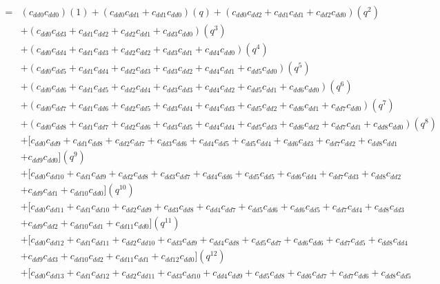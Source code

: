 \documentclass[12pt]{article}
\begin{document}
\begin{align}
    =& (c_{dd0}c_{dd0})(1) + (c_{dd0}c_{dd1} + c_{dd1}c_{dd0})(q) + (c_{dd0}c_{dd2} + c_{dd1}c_{dd1} + c_{dd2}c_{dd0})(q^2) \nonumber\\
    &+ (c_{dd0}c_{dd3} + c_{dd1}c_{dd2} + c_{dd2}c_{dd1} + c_{dd3}c_{dd0})(q^3) \nonumber\\
    &+ (c_{dd0}c_{dd4} + c_{dd1}c_{dd3} + c_{dd2}c_{dd2} + c_{dd3}c_{dd1} + c_{dd4}c_{dd0})(q^4) \nonumber\\
    &+ (c_{dd0}c_{dd5} + c_{dd1}c_{dd4} + c_{dd2}c_{dd3} + c_{dd3}c_{dd2} + c_{dd4}c_{dd1} + c_{dd5}c_{dd0})(q^5) \nonumber\\
    &+ (c_{dd0}c_{dd6} + c_{dd1}c_{dd5} + c_{dd2}c_{dd4} + c_{dd3}c_{dd3} + c_{dd4}c_{dd2} + c_{dd5}c_{dd1} + c_{dd6}c_{dd0})(q^6) \nonumber\\
    &+ (c_{dd0}c_{dd7} + c_{dd1}c_{dd6} + c_{dd2}c_{dd5} + c_{dd3}c_{dd4} + c_{dd4}c_{dd3} + c_{dd5}c_{dd2} + c_{dd6}c_{dd1} + c_{dd7}c_{dd0})(q^7) \nonumber\\
    &+ (c_{dd0}c_{dd8} + c_{dd1}c_{dd7} + c_{dd2}c_{dd6} + c_{dd3}c_{dd5} + c_{dd4}c_{dd4} + c_{dd5}c_{dd3} + c_{dd6}c_{dd2} + c_{dd7}c_{dd1} + c_{dd8}c_{dd0})(q^8) \nonumber\\
    &+ [c_{dd0}c_{dd9} + c_{dd1}c_{dd8} + c_{dd2}c_{dd7} + c_{dd3}c_{dd6} + c_{dd4}c_{dd5} + c_{dd5}c_{dd4} + c_{dd6}c_{dd3} + c_{dd7}c_{dd2} + c_{dd8}c_{dd1} \nonumber\\
    &+ c_{dd9}c_{dd0}](q^9) \nonumber\\
    &+ [c_{dd0}c_{dd10} + c_{dd1}c_{dd9} + c_{dd2}c_{dd8} + c_{dd3}c_{dd7} + c_{dd4}c_{dd6} + c_{dd5}c_{dd5} + c_{dd6}c_{dd4} + c_{dd7}c_{dd3} + c_{dd8}c_{dd2} \nonumber\\
    &+ c_{dd9}c_{dd1} + c_{dd10}c_{dd0}](q^{10}) \nonumber\\
    &+ [c_{dd0}c_{dd11} + c_{dd1}c_{dd10} + c_{dd2}c_{dd9} + c_{dd3}c_{dd8} + c_{dd4}c_{dd7} + c_{dd5}c_{dd6} + c_{dd6}c_{dd5} + c_{dd7}c_{dd4} + c_{dd8}c_{dd3} \nonumber\\
    &+ c_{dd9}c_{dd2} + c_{dd10}c_{dd1} + c_{dd11}c_{dd0} ](q^{11}) \nonumber\\
    &+ [c_{dd0}c_{dd12} + c_{dd1}c_{dd11} + c_{dd2}c_{dd10} + c_{dd3}c_{dd9} + c_{dd4}c_{dd8} + c_{dd5}c_{dd7} + c_{dd6}c_{dd6} + c_{dd7}c_{dd5} + c_{dd8}c_{dd4} \nonumber\\
    &+ c_{dd9}c_{dd3} + c_{dd10}c_{dd2} + c_{dd11}c_{dd1} + c_{dd12}c_{dd0}](q^{12}) \nonumber\\
    &+ [c_{dd0}c_{dd13} + c_{dd1}c_{dd12} + c_{dd2}c_{dd11} + c_{dd3}c_{dd10} + c_{dd4}c_{dd9} +  c_{dd5}c_{dd8} + c_{dd6}c_{dd7} + c_{dd7}c_{dd6} + c_{dd8}c_{dd5} \nonumber\\

\end{align}
\end{document}
